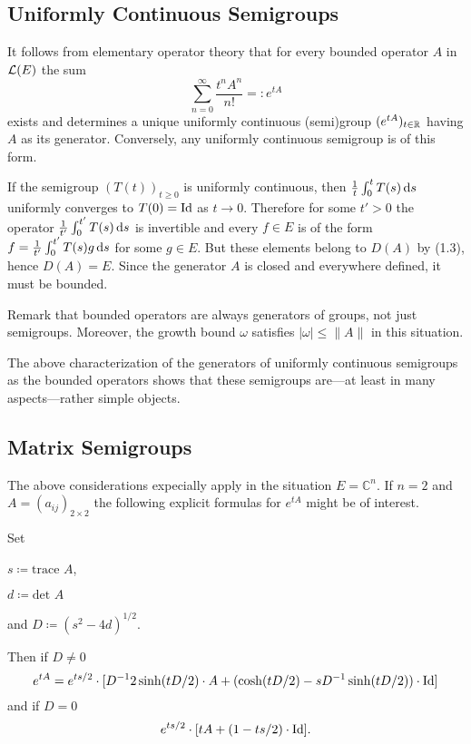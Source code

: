 \subsection{Uniformly Continuous Semigroups}\label{subsec:a1-2.1}
It follows from elementary operator theory that for every bounded operator $A$ in  $\mathcal{L}(E)$ the sum
\[
    \sum_{n=0}^{\infty} \frac{t^{n}A^{n}}{n!} = \colon e^{tA}
\]
exists and determines a unique uniformly continuous (semi)group $(e^{tA})_{t \in \mathbb{R}}$ having $A$ as its generator.
Conversely, any uniformly continuous semigroup is of this form.

If the semigroup $(T(t))_{t \geq 0}$ is uniformly continuous, then $\frac{1}{t}\int_{0}^{t} T(s) \mathop{}\!\mathrm{d}{s}$ uniformly converges to $T(0) = \operatorname{Id}$ as $t \to 0$.
Therefore for some $t' > 0$ the operator $\frac{1}{t'}\int_{0}^{t'} T(s) \mathop{}\!\mathrm{d}{s}$ is invertible and every $f \in E$ is of the form $f = \frac{1}{t'}\int_{0}^{t'} T(s)g \mathop{}\!\mathrm{d}{s}$ for some $g \in E$.
But these elements belong to $D(A)$ by (1.3), hence $D(A) = E$.
Since the generator $A$ is closed and everywhere defined, it must be bounded.

Remark that bounded operators are always generators of groups, not just semigroups.
Moreover, the growth bound $\omega$ satisfies $|\omega| \leq \|A\|$ in this situation.

The above characterization of the generators of uniformly continuous semigroups as the bounded operators shows that these semigroups are---at least in many aspects---rather simple objects.
\subsection{Matrix Semigroups}\label{subsec:a1-2.2}
The above considerations expecially apply in the situation $E = \mathbb{C}^{n}$.
If $n = 2$ and $A = (a_{ij})_{2 \times 2}$ the following explicit formulas for $e^{tA}$ might be of interest.

Set
\begin{enumerate*}[(i)]
\item
$s \coloneqq \text{trace } A$, 

\item
$d \coloneqq \text{det } A$

\item
and $D \coloneqq (s^{2} - 4d)^{1/2}$.
\end{enumerate*}
Then if  $D \neq 0$
\[
    e^{tA} = 
        e^{ts/2} \cdot [D^{-1}2\sinh(tD/2) \cdot A + (\cosh(tD/2) - sD^{-1}\sinh(tD/2)) \cdot \operatorname{Id}] 
\]
and if $D=0$
\[
	e^{ts/2} \cdot [tA + (1 - ts/2) \cdot \operatorname{Id}] .
\]
